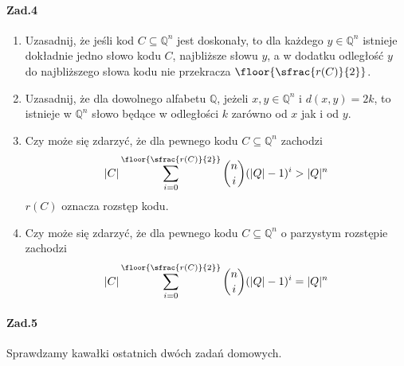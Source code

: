 \paragraph{Zad.4}
\begin{enumerate}[label=\alph*)]
\item Uzasadnij, że jeśli kod $C \subseteq \mathbb{Q}^n$ jest doskonały, to dla każdego $y\in \mathbb{Q}^n$ istnieje dokładnie jedno słowo kodu $C$, najbliższe słowu $y$, a w dodatku odległość $y$ do najbliższego słowa kodu nie przekracza $\floor{\sfrac{r(C)}{2}}$.
\item Uzasadnij, że dla dowolnego alfabetu $\mathbb{Q}$, jeżeli $x,y\in \mathbb{Q}^n$ i $d(x, y) = 2k$, to istnieje w $\mathbb{Q}^n$ słowo będące w odległości $k$ zarówno od $x$ jak i od $y$.
\item Czy może się zdarzyć, że dla pewnego kodu $C \subseteq \mathbb{Q}^n$ zachodzi
$$|C|\sum_{i=0}^{\floor{\sfrac{r(C)}{2}}}\binom{n}{i}(|Q|-1)^i>|Q|^n$$
$r(C)$ oznacza rozstęp kodu.
\item Czy może się zdarzyć, że dla pewnego kodu $C \subseteq \mathbb{Q}^n$ o parzystym rozstępie zachodzi
$$|C|\sum_{i=0}^{\floor{\sfrac{r(C)}{2}}}\binom{n}{i}(|Q|-1)^i=|Q|^n$$
\end{enumerate}

\paragraph{Zad.5} Sprawdzamy kawałki ostatnich dwóch zadań domowych.


